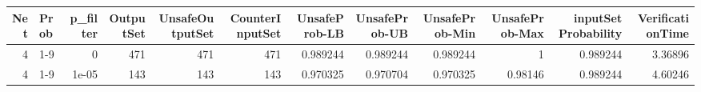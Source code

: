 \begin{tabular}{rlrrrrrrrrrr}
\hline
   Net & Prob   &   p\_filter &   OutputSet &   UnsafeOutputSet &   CounterInputSet &   UnsafeProb-LB &   UnsafeProb-UB &   UnsafeProb-Min &   UnsafeProb-Max &   inputSet Probability &   VerificationTime \\
\hline
     4 & 1-9    &      0     &         471 &               471 &               471 &        0.989244 &        0.989244 &         0.989244 &          1       &               0.989244 &            3.36896 \\
     4 & 1-9    &      1e-05 &         143 &               143 &               143 &        0.970325 &        0.970704 &         0.970325 &          0.98146 &               0.989244 &            4.60246 \\
\hline
\end{tabular}
